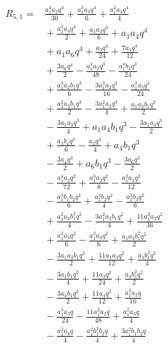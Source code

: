 \begin{align*}
R_{5,1}={}& \frac{a_{1}^{4} a_{2} q^{4}}{30} + \frac{a_{1}^{3} a_{3} q^{4}}{6} + \frac{a_{1}^{2} a_{3} q^{4}}{4}\\
&{}+ \frac{a_{1}^{2} a_{4} q^{4}}{2} + \frac{a_{1} a_{3} q^{4}}{6} + a_{1} a_{4} q^{4}\\
&{}+ a_{1} a_{6} q^{4} + \frac{a_{3} q^{4}}{24} + \frac{7 a_{4} q^{4}}{12}\\
&{}+ \frac{3 a_{6} q^{4}}{2} - \frac{a_{1}^{4} a_{2} q^{3}}{48} - \frac{a_{1}^{4} b_{2} q^{3}}{24}\\
&{}+ \frac{a_{1}^{3} a_{2} b_{1} q^{3}}{6} - \frac{3 a_{1}^{3} a_{2} q^{3}}{16} - \frac{a_{1}^{3} a_{3} q^{3}}{24}\\
&{}+ \frac{a_{1}^{2} a_{3} b_{1} q^{3}}{2} - \frac{3 a_{1}^{2} a_{3} q^{3}}{4} + \frac{a_{1} a_{3} b_{1} q^{3}}{2}\\
&{}- \frac{3 a_{1} a_{3} q^{3}}{4} + a_{1} a_{4} b_{1} q^{3} - \frac{3 a_{1} a_{4} q^{3}}{2}\\
&{}+ \frac{a_{3} b_{1} q^{3}}{6} - \frac{a_{3} q^{3}}{4} + a_{4} b_{1} q^{3}\\
&{}- \frac{3 a_{4} q^{3}}{2} + a_{6} b_{1} q^{3} - \frac{3 a_{6} q^{3}}{2}\\
&{}- \frac{a_{1}^{4} a_{2} q^{2}}{72} + \frac{a_{1}^{3} a_{2} q^{2}}{8} - \frac{a_{1}^{3} a_{3} q^{2}}{12}\\
&{}- \frac{a_{1}^{3} b_{1} b_{2} q^{2}}{6} + \frac{a_{1}^{3} b_{2} q^{2}}{4} - \frac{a_{1}^{3} b_{3} q^{2}}{6}\\
&{}+ \frac{a_{1}^{2} a_{2} b_{1}^{2} q^{2}}{4} - \frac{3 a_{1}^{2} a_{2} b_{1} q^{2}}{4} + \frac{11 a_{1}^{2} a_{2} q^{2}}{36}\\
&{}+ \frac{a_{1}^{2} a_{3} q^{2}}{6} - \frac{a_{1}^{2} a_{4} q^{2}}{6} + \frac{a_{1} a_{3} b_{1}^{2} q^{2}}{2}\\
&{}- \frac{3 a_{1} a_{3} b_{1} q^{2}}{2} + \frac{11 a_{1} a_{3} q^{2}}{12} + \frac{a_{3} b_{1}^{2} q^{2}}{4}\\
&{}- \frac{3 a_{3} b_{1} q^{2}}{4} + \frac{11 a_{3} q^{2}}{24} + \frac{a_{4} b_{1}^{2} q^{2}}{2}\\
&{}- \frac{3 a_{4} b_{1} q^{2}}{2} + \frac{11 a_{4} q^{2}}{12} + \frac{a_{1}^{3} a_{2} q}{16}\\
&{}- \frac{a_{1}^{3} a_{3} q}{24} - \frac{11 a_{1}^{2} a_{2} q}{48} + \frac{a_{1}^{2} a_{3} q}{4}\\
&{}- \frac{a_{1}^{2} a_{4} q}{4} - \frac{a_{1}^{2} b_{1}^{2} b_{2} q}{4} + \frac{3 a_{1}^{2} b_{1} b_{2} q}{4}\\

\end{align*}
